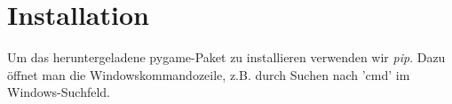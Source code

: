 \documentclass[ngerman,oneside, a4letter]{article}
\begin{document}
\section{Installation}
Um das heruntergeladene pygame-Paket zu installieren verwenden wir \emph{pip}.
Dazu öffnet man die Windowskommandozeile, z.B. durch Suchen nach 'cmd' im Windows-Suchfeld.

\begin{center}
	\end{center}


\pagebreak
\end{document}
